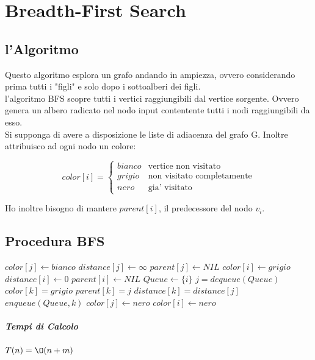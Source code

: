 \chapter{Breadth-First Search}

\section{l'Algoritmo}

Questo algoritmo esplora un grafo andando in ampiezza, ovvero considerando prima tutti i "figli" e solo dopo i sottoalberi dei figli. \\
l'algoritmo BFS scopre tutti i vertici raggiungibili dal vertice sorgente. Ovvero genera un albero radicato nel nodo input contentente tutti i nodi raggiungibili da esso. \\
Si supponga di avere a disposizione le liste di adiacenza del grafo G.
Inoltre attribuisco ad ogni nodo un colore:

\[
    color[i] = 
    \begin{cases}
        bianco & \text{vertice non visitato}\\
        grigio & \text{non visitato completamente}\\
        nero & \text{gia' visitato}
    \end{cases}
\]

Ho inoltre bisogno di mantere $parent[i]$, il predecessore del nodo $v_{i}$.

\newpage

\section{Procedura BFS}

\begin{algorithm}
    \begin{algorithmic}
            \State $color[j] \gets bianco$
            \State $distance[j] \gets \infty$
            \State $parent[j] \gets NIL$
        \EndFor
        \State $color[i] \gets grigio$ 
        \State $distance[i] \gets 0$ 
        \State $parent[i] \gets NIL$
        \State $Queue \gets \{i\}$
            \State $j = dequeue(Queue)$
                    \State $color[k] = grigio$
                    \State $parent[k] = j$
                    \State $distance[k] = distance[j]$
                    \State $enqueue(Queue, k)$
                \EndIf
            \EndFor
            \State $color[j] \gets nero$ 
        \EndWhile
        \State $color[i] \gets nero$ 
        \EndProcedure
    \end{algorithmic}
\end{algorithm}

\paragraph{Tempi di Calcolo}

$T(n) = \O(n + m)$

